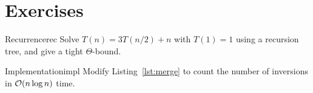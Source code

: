 \section{Exercises}

\begin{exercise}{Recurrence}{rec}
Solve $T(n)=3T(n/2)+n$ with $T(1)=1$ using a recursion tree, and give a tight
$\Theta$-bound.
\end{exercise}

\begin{exercise}{Implementation}{impl}
Modify Listing~\ref{lst:merge} to count the number of inversions in $\O(n\log n)$ time.
\end{exercise}
